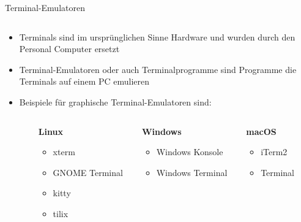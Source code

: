 \begin{frame}{Terminal-Emulatoren}
  \begin{columns}
    \begin{column}{0.5\textwidth}
      \begin{itemize}
        \item Terminals sind im ursprünglichen Sinne Hardware und wurden durch den Personal Computer ersetzt
        \item Terminal-Emulatoren oder auch Terminalprogramme sind Programme die Terminals auf einem PC emulieren
        \item Beispiele für graphische Terminal-Emulatoren sind:
        \begin{columns}[t, onlytextwidth]
          \begin{column}{0.1\textwidth}
          \end{column}
          \begin{column}{0.3\textwidth}
          \textbf{Linux}
          \begin{itemize}
              \item xterm
              \item GNOME Terminal
              \item kitty
              \item tilix
          \end{itemize}
          \end{column}
          \hfill
          \begin{column}{0.3\textwidth}
          \textbf{Windows}
          \begin{itemize}
              \item Windows Konsole
              \item Windows Terminal
          \end{itemize}
          \end{column}
          \hfill
          \begin{column}{0.3\textwidth}
          \textbf{macOS}
          \begin{itemize}
              \item iTerm2
              \item Terminal
          \end{itemize}
          \end{column}
          \end{columns}
      \end{itemize}
    \end{column}
    \begin{column}{0.5\textwidth}

\end{column}
\end{columns}
\end{frame}
